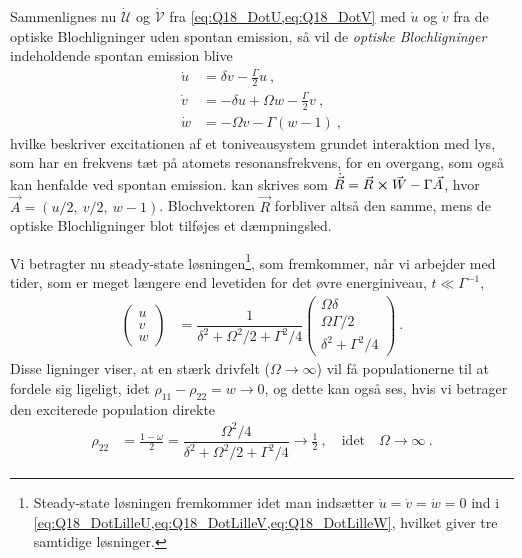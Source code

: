 Sammenlignes nu $\Dot{\mathcal{U}}$ og $\Dot{\mathcal{V}}$ fra \cref{eq:Q18_DotU,eq:Q18_DotV} med $\Dot{u}$ og $\Dot{v}$ fra de optiske Blochligninger uden spontan emission, så vil de \emph{optiske Blochligninger} indeholdende spontan emission blive
\begin{align}
    \Dot{u} &= \delta v - \frac{\Gamma}{2}u \: , \label{eq:Q18_DotLilleU} \\
    \Dot{v} &= -\delta u + \Omega w - \frac{\Gamma}{2}v \: , \label{eq:Q18_DotLilleV} \\
    \Dot{w} &= -\Omega v - \Gamma(w - 1) \: , \label{eq:Q18_DotLilleW}
\end{align}
hvilke beskriver excitationen af et toniveausystem grundet interaktion med lys, som har en frekvens tæt på atomets resonansfrekvens, for en overgang, som også kan henfalde ved spontan emission.  kan skrives som $\Dot{\Vec{R}} = \Vec{R} \cross \Vec{W} - \Gamma \Vec{A}$, hvor $\Vec{A} = (u/2,\: v/2,\: w - 1)$. Blochvektoren $\Vec{R}$ forbliver altså den samme, mens de optiske Blochligninger blot tilføjes et dæmpningsled.

Vi betragter nu steady-state løsningen\footnote{Steady-state løsningen fremkommer idet man indsætter $\Dot{u} = \Dot{v} = \Dot{w} = 0$ ind i \cref{eq:Q18_DotLilleU,eq:Q18_DotLilleV,eq:Q18_DotLilleW}, hvilket giver tre samtidige løsninger.}, som fremkommer, når vi arbejder med tider, som er meget længere end levetiden for det øvre energiniveau, $t \ll \Gamma^{-1}$,
\begin{align}
    \begin{pmatrix}
        u \\
        v \\
        w
    \end{pmatrix}
    &= \dfrac{1}{\delta^2 + \Omega^2 / 2 + \Gamma^2 / 4}
        \begin{pmatrix}
            \Omega\delta \\
            \Omega\Gamma/2 \\
            \delta^2 + \Gamma^2 / 4
        \end{pmatrix}
        \: .
\end{align}
Disse ligninger viser, at en stærk drivfelt ($\Omega \rightarrow \infty$) vil få populationerne til at fordele sig ligeligt, idet $\rho_{11} - \rho_{22} = w \rightarrow 0$, og dette kan også ses, hvis vi betrager den exciterede population direkte
\begin{align}
    \rho_{22} &= \frac{1 - \omega}{2} = \dfrac{\Omega^2 / 4}{\delta^2 + \Omega^2 / 2 + \Gamma^2 / 4} \rightarrow \frac{1}{2} \: , \quad \text{idet} \quad \Omega \rightarrow \infty \: .
\end{align}
